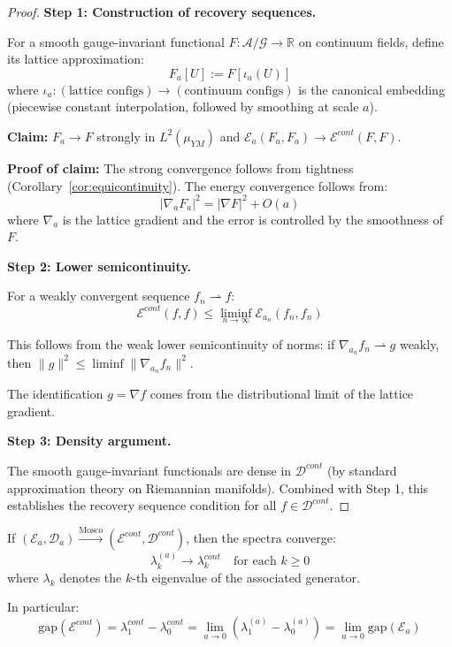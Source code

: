 \begin{proof}
\textbf{Step 1: Construction of recovery sequences.}

For a smooth gauge-invariant functional $F: \mathcal{A}/\mathcal{G} \to \mathbb{R}$ 
on continuum fields, define its lattice approximation:
\[
F_a[U] := F[\iota_a(U)]
\]
where $\iota_a: (\text{lattice configs}) \to (\text{continuum configs})$ is the 
canonical embedding (piecewise constant interpolation, followed by smoothing 
at scale $a$).

\textbf{Claim:} $F_a \to F$ strongly in $L^2(\mu_{YM})$ and 
$\mathcal{E}_a(F_a, F_a) \to \mathcal{E}^{cont}(F, F)$.

\textbf{Proof of claim:} The strong convergence follows from tightness 
(Corollary~\ref{cor:equicontinuity}). The energy convergence follows from:
\[
|\nabla_a F_a|^2 = |\nabla F|^2 + O(a)
\]
where $\nabla_a$ is the lattice gradient and the error is controlled by the 
smoothness of $F$.

\textbf{Step 2: Lower semicontinuity.}

For a weakly convergent sequence $f_n \rightharpoonup f$:
\[
\mathcal{E}^{cont}(f, f) \leq \liminf_{n \to \infty} \mathcal{E}_{a_n}(f_n, f_n)
\]

This follows from the weak lower semicontinuity of norms: if $\nabla_{a_n} f_n 
\rightharpoonup g$ weakly, then $\|g\|^2 \leq \liminf \|\nabla_{a_n} f_n\|^2$.

The identification $g = \nabla f$ comes from the distributional limit of the 
lattice gradient.

\textbf{Step 3: Density argument.}

The smooth gauge-invariant functionals are dense in $\mathcal{D}^{cont}$ 
(by standard approximation theory on Riemannian manifolds). Combined with 
Step 1, this establishes the recovery sequence condition for all $f \in \mathcal{D}^{cont}$.
\end{proof}

\begin{theorem}
\label{thm:spectral-mosco-app89}
If $(\mathcal{E}_a, \mathcal{D}_a) \xrightarrow{\text{Mosco}} (\mathcal{E}^{cont}, \mathcal{D}^{cont})$, 
then the spectra converge:
\[
\lambda_k^{(a)} \to \lambda_k^{cont} \quad \text{for each } k \geq 0
\]
where $\lambda_k$ denotes the $k$-th eigenvalue of the associated generator.

In particular:
\[
\text{gap}(\mathcal{E}^{cont}) = \lambda_1^{cont} - \lambda_0^{cont} = \lim_{a \to 0} 
(\lambda_1^{(a)} - \lambda_0^{(a)}) = \lim_{a \to 0} \text{gap}(\mathcal{E}_a)
\]
\end{theorem}

